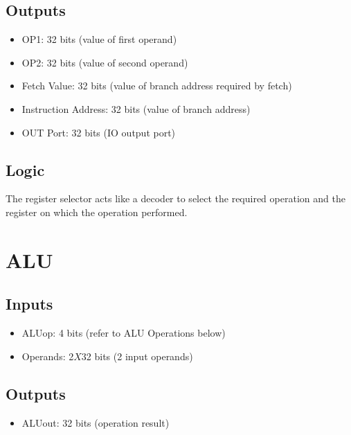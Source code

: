 \documentclass[12pt]{report}
\begin{document}
\subsection{Outputs}
\begin{itemize}
    \item OP1: 32 bits (value of first operand)
    \item OP2: 32 bits (value of second operand)
    \item Fetch Value: 32 bits (value of branch address required by fetch)
    \item Instruction Address: 32 bits (value of branch address)
    \item OUT Port: 32 bits (IO output port)
\end{itemize}

\subsection{Logic}
The register selector acts like a decoder to select the required operation and the register on which the operation performed.

\section{ALU}

\subsection{Inputs}
\begin{itemize}
    \item ALUop: 4 bits (refer to ALU Operations below)
    \item Operands: 2$X$32 bits (2 input operands)
\end{itemize}

\subsection{Outputs}
\begin{itemize}
    \item ALUout: 32 bits (operation result)
\end{itemize}
\end{document}
